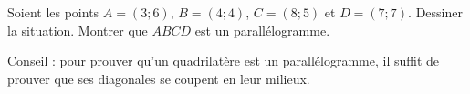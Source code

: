 
\begin{exercice}\label{exoSeconde-0055}

    Soient les points \( A=(3;6)\), \( B=(4;4)\), \( C=(8;5)\) et \( D=(7;7)\). Dessiner la situation. Montrer que \( ABCD\) est un parallélogramme.

    Conseil : pour prouver qu'un quadrilatère est un parallélogramme, il suffit de prouver que ses diagonales se coupent en leur milieux.

\end{exercice}
